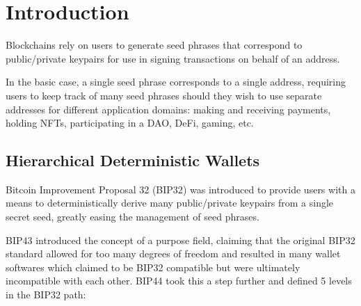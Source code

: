 \documentclass[12pt, a4paper, twocolumn]{article}
\begin{document}




\section{Introduction}

Blockchains rely on users to generate seed phrases that correspond to public/private keypairs for use in signing transactions on behalf of an address.

In the basic case, a single seed phrase corresponds to a single address, requiring users to keep track of many seed phrases should they wish to use separate addresses for different application domains: making and receiving payments, holding NFTs, participating in a DAO, DeFi, gaming, etc.


\subsection{Hierarchical Deterministic Wallets}
\label{subsec:hd_wallets}

Bitcoin Improvement Proposal 32 (BIP32\cite{BIP32}) was introduced to provide users with a means to deterministically derive many public/private keypairs from a single secret seed, greatly easing the management of seed phrases.

BIP43\cite{BIP43} introduced the concept of a purpose field, claiming that the original BIP32 standard allowed for too many degrees of freedom and resulted in many wallet softwares which claimed to be BIP32 compatible but were ultimately incompatible with each other. BIP44\cite{BIP44} took this a step further and defined 5 levels in the BIP32 path:
\end{document}
